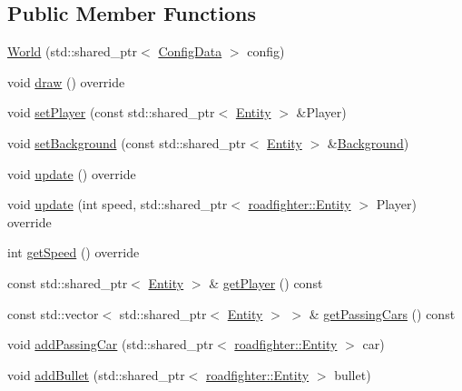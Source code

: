 \subsection*{Public Member Functions}
\begin{DoxyCompactItemize}
\item 
\hyperlink{classroadfighter_1_1World_a4a099b8b3dde5d25daa4d9f778b0342c}{World} (std\+::shared\+\_\+ptr$<$ \hyperlink{classConfigData}{Config\+Data} $>$ config)
\item 
void \hyperlink{classroadfighter_1_1World_a90534263a154d6d7c1e8aef4e0138881}{draw} () override
\item 
void \hyperlink{classroadfighter_1_1World_ae29618ab34613cd4f0e9caafcae742ac}{set\+Player} (const std\+::shared\+\_\+ptr$<$ \hyperlink{classroadfighter_1_1Entity}{Entity} $>$ \&Player)
\item 
void \hyperlink{classroadfighter_1_1World_a7e6c8b0988474726a08e0c70522093c5}{set\+Background} (const std\+::shared\+\_\+ptr$<$ \hyperlink{classroadfighter_1_1Entity}{Entity} $>$ \&\hyperlink{classroadfighter_1_1Background}{Background})
\item 
void \hyperlink{classroadfighter_1_1World_af4988cdad9b54a049de1a29ff87679ec}{update} () override
\item 
void \hyperlink{classroadfighter_1_1World_a8c26e9cb031b250cdc263623615c1891}{update} (int speed, std\+::shared\+\_\+ptr$<$ \hyperlink{classroadfighter_1_1Entity}{roadfighter\+::\+Entity} $>$ Player) override
\item 
int \hyperlink{classroadfighter_1_1World_a0ec7ca6d1df344ec56cf55d6d436b24c}{get\+Speed} () override
\item 
const std\+::shared\+\_\+ptr$<$ \hyperlink{classroadfighter_1_1Entity}{Entity} $>$ \& \hyperlink{classroadfighter_1_1World_a50d685095c0ed48bef2b3f1ba20bb608}{get\+Player} () const
\item 
const std\+::vector$<$ std\+::shared\+\_\+ptr$<$ \hyperlink{classroadfighter_1_1Entity}{Entity} $>$ $>$ \& \hyperlink{classroadfighter_1_1World_a97a458e140c6da6cd93422b683bcc87c}{get\+Passing\+Cars} () const
\item 
void \hyperlink{classroadfighter_1_1World_ae9c77c5d9b4c5caeb74f417284572237}{add\+Passing\+Car} (std\+::shared\+\_\+ptr$<$ \hyperlink{classroadfighter_1_1Entity}{roadfighter\+::\+Entity} $>$ car)
\item 
void \hyperlink{classroadfighter_1_1World_a258d294a9b5ed0baf09b9370a5c45e9b}{add\+Bullet} (std\+::shared\+\_\+ptr$<$ \hyperlink{classroadfighter_1_1Entity}{roadfighter\+::\+Entity} $>$ bullet)

\end{DoxyCompactItemize}
